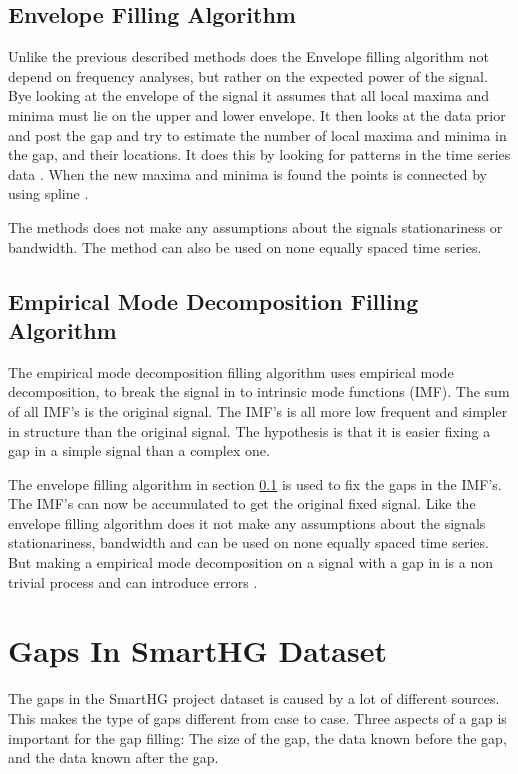 \subsection{Envelope Filling Algorithm}
\label{T:EGA}
Unlike the previous described methods does the Envelope filling algorithm not depend on frequency analyses, but rather on the expected power of the signal. Bye looking at the envelope of the signal it assumes that all local maxima and minima must lie on the  upper and lower envelope. It then looks at the data prior and post the gap and try to estimate the number of local maxima and minima in the gap, and their locations. It does this by looking for patterns in the time series data \citep{RefWorks:6}. When the new maxima and minima is found the points is connected by using spline \cite{RefWorks:16}. 

The methods does not make any assumptions about the signals stationariness or bandwidth. The method can also be used on none equally spaced time series. 

\subsection{Empirical Mode Decomposition Filling Algorithm}
The empirical mode decomposition filling algorithm uses empirical mode decomposition, to break the signal in to intrinsic mode functions (IMF). The sum of all IMF's is the original signal. The IMF's is all more low frequent and simpler in structure than the original signal. The hypothesis is that it is easier fixing a gap in a simple signal than a complex one. 

The envelope filling algorithm in section \ref{T:EGA} is used to fix the gaps in the IMF's. The IMF's can now be accumulated to get the original fixed signal. Like the envelope filling algorithm does it not make any assumptions about the signals stationariness, bandwidth and can be used on none equally spaced time series. But making a empirical mode decomposition on a signal with a gap in is a non trivial process and can introduce errors \citep{RefWorks:16}. 


\section{Gaps In SmartHG Dataset}
The gaps in the SmartHG project dataset is caused by a lot of different sources. This makes the type of gaps different from case to case. Three aspects of a gap is important for the gap filling: The size of the gap, the data known before the gap, and the data known after the gap. 

